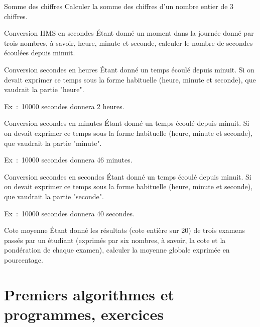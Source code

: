 		\begin{Exercice}{Somme des chiffres}
			Calculer la somme des chiffres
			d’un nombre entier de 3 chiffres.
		\end{Exercice}
	
		\begin{Exercice}{Conversion HMS en secondes}
			Étant donné un moment dans la journée donné
			par trois nombres, à savoir, heure, minute et seconde, calculer le
			nombre de secondes écoulées depuis minuit.
		\end{Exercice}
	
		\begin{Exercice}{Conversion secondes en heures}
			Étant donné un temps écoulé depuis minuit.
			Si on devait exprimer ce temps sous la forme
			habituelle (heure, minute et seconde),
			que vaudrait la partie "heure".
	
			Ex~:~10000 secondes donnera 2 heures.
		\end{Exercice}
	
		\begin{Exercice}{Conversion secondes en minutes}
			Étant donné un temps écoulé depuis minuit.
			Si on devait exprimer ce temps sous la forme
			habituelle (heure, minute et seconde),
			que vaudrait la partie "minute".
	
			Ex~:~10000 secondes donnera 46 minutes.
		\end{Exercice}
	
		\begin{Exercice}{Conversion secondes en secondes}
			Étant donné un temps écoulé depuis minuit.
			Si on devait exprimer ce temps sous la forme
			habituelle (heure, minute et seconde),
			que vaudrait la partie "seconde".
	
			Ex~:~10000 secondes donnera 40 secondes.
		\end{Exercice}	
	
		\begin{Exercice}{Cote moyenne}
			Étant donné les résultats (cote entière sur
			20) de trois examens passés par un étudiant (exprimés par six nombres,
			à savoir, la cote et la pondération de chaque examen), calculer 
			la moyenne globale exprimée en pourcentage.
		\end{Exercice}


\section{Premiers algorithmes et programmes, exercices}
\label{prem-ex-simple}

